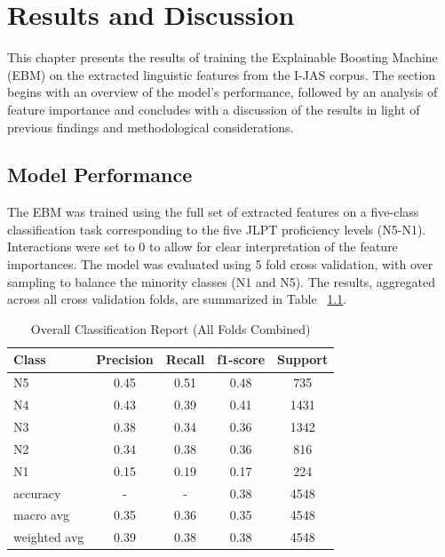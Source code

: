 \chapter{Results and Discussion}
This chapter presents the results of training the Explainable Boosting Machine (EBM) on the extracted linguistic
features from the I-JAS corpus. The section begins with an overview of the model's performance, followed by an
analysis of feature importance and concludes with a discussion of the results in light of previous findings and
methodological considerations.


\section{Model Performance}

The EBM was trained using the full set of extracted features on a five-class classification task corresponding to
the five JLPT proficiency levels (N5-N1). Interactions were set to 0 to allow for clear interpretation of the
feature importances. The model was
evaluated using 5 fold cross validation,
with over sampling to balance the minority classes (N1 and N5). The results, aggregated across all cross validation
folds, are summarized
in Table~
\ref{tab:trainingResults}.


\begin{table}[h!]
    \centering
    \begin{tabular}{lcccc}
        \hline \textbf{Class} & \textbf{Precision} & \textbf{Recall} & \textbf{f1-score} & \textbf{Support} \\ \hline
        N5    &   0.45   &   0.51   &   0.48   &    735\\
          N4    &   0.43   &   0.39   &   0.41   &   1431\\
          N3    &   0.38   &   0.34   &   0.36  &    1342\\
          N2  &     0.34   &   0.38  &    0.36   &    816\\
          N1    &   0.15   &   0.19   &   0.17    &   224\\ \hline
        accuracy &   -    &      -    &     0.38  &    4548\\
   macro avg  &     0.35   &   0.36  &    0.35   &   4548\\
weighted avg  &     0.39  &    0.38    &  0.38   &   4548\\ \hline
    \end{tabular}
    \caption[Overall Classification Report (All Folds Combined)]{Overall Classification Report (All Folds Combined)}
    \label{tab:trainingResults}
\end{table}

